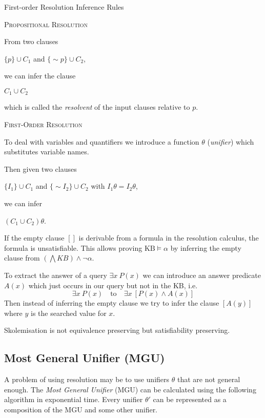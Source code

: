 \documentclass[english]{panikzettel}
\begin{document}
\begin{defi}{First-order Resolution Inference Rules}
\begin{halfboxl}
\textsc{Propositional Resolution}

From two clauses
\begin{tightcenter}
$\{p\}\cup C_1$ and $\{{\sim}p\}\cup C_2$,
\end{tightcenter}
we can infer the clause
\begin{tightcenter}
$C_1\cup C_2$
\end{tightcenter}
which is called the \emph{resolvent} of the input clauses relative to $p$.
\end{halfboxl}%
\begin{halfboxr}
\vspace{-\baselineskip}
\textsc{First-Order Resolution}

To deal with variables and quantifiers we introduce a function $\theta$ (\emph{unifier}) which substitutes variable names.

Then given two clauses
\begin{tightcenter}
$\{I_1\}\cup C_1$ and $\{{\sim}I_2\}\cup C_2$ with $I_1\theta = I_2\theta$,
\end{tightcenter}
we can infer
\begin{tightcenter}
$(C_1\cup C_2)\theta$.
\end{tightcenter}
\end{halfboxr}
\end{defi}

If the empty clause $[]$ is derivable from a formula in the resolution calculus, the formula is unsatisfiable.
This allows proving $\text{KB} \models \alpha$ by inferring the empty clause from $(\bigwedge KB) \land \neg \alpha$.

To extract the answer of a query $\exists x~ P(x)$ we can introduce an answer predicate $A(x)$ which just occurs in our query but not in the KB, i.e.\
\[ \exists x~ P(x) \quad\text{to}\quad \exists x~ [P(x) \land A(x)] \]
Then instead of inferring the empty clause we try to infer the clause $[A(y)]$ where $y$ is the searched value for $x$.

Skolemisation is not equivalence preserving but satisfiability preserving.

\subsection{Most General Unifier (MGU)}
A problem of using resolution may be to use unifiers $\theta$ that are not general enough.
The \emph{Most General Unifier} (MGU) can be calculated using the following algorithm in exponential time.
Every unifier $\theta'$ can be represented as a composition of the MGU and some other unifier.
\end{document}
